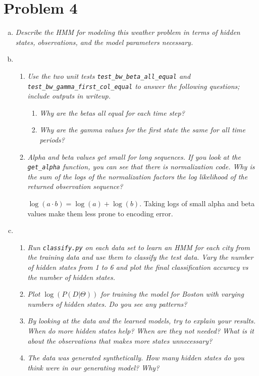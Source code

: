 \documentclass{article}
\begin{document}
\section*{Problem 4}
\begin{enumerate}[(a)]
\item \emph{Describe the HMM for modeling this weather problem in terms of hidden
  states, observations, and the model parameters necessary.}

\item 
  \begin{enumerate}
  \setcounter{enumiii}2
  \item \emph{Use the two unit tests \emph{\texttt{test\_bw\_beta\_all\_equal}}
    and 
    \emph{\texttt{test\_bw\_gamma\_first\_col\_equal}} to answer the following questions;
    include outputs in writeup.}

    \begin{enumerate}[(1)]
    \item \emph{Why are the betas all equal for each time step?}
    \item \emph{Why are the gamma values for the first state the same for all time periods?}
    \end{enumerate}

  \item \emph{Alpha and beta values get small for long sequences. If you look at the 
    \emph{\texttt{get\_alpha}} function, you can see that there is normalization code. 
    Why is the sum of the logs of the normalization factors the log likelihood of
    the returned observation sequence?}

    $\log(a\cdot b)=\log(a)+\log(b)$. Taking logs of small alpha and beta values 
    make them less prone to encoding error. 

  \end{enumerate} 

\item
  \begin{enumerate}
  \item \emph{Run \texttt{\emph{classify.py}} on each data set to learn an HMM
    for each city from the training data and use them to classify the test data. 
    Vary the number of hidden states from 1 to 6 and plot the final classification
    accuracy vs the number of hidden states.}

  \item \emph{Plot $\log(P(D|\Theta))$ for training the model for Boston with 
    varying numbers of hidden states. Do you see any patterns?}

  \item \emph{By looking at the data and the learned models, try to explain your 
    results. When do more hidden states help? When are they not needed? What is
    it about the observations that makes more states unnecessary?}

  \item \emph{The data was generated synthetically. How many hidden states do you
    think were in our generating model? Why?}

  \end{enumerate}
\end{enumerate}
\end{document}
